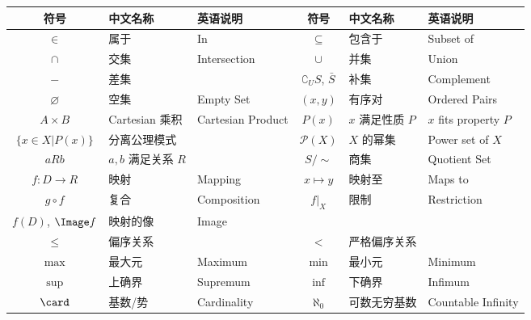 \documentclass[UTF8]{ctexart}
\begin{document}
            \begin{center}
                \begin{tabular}{|c|l|l||c|l|l|}
                    \hline
                    符号 & 中文名称 & 英语说明 & 符号 & 中文名称 & 英语说明\\
                    \hline\hline
                    $\in$ & 属于 & In & $\subseteq$ & 包含于 & Subset of\\
                    \hline
                    $\cap$ & 交集 & Intersection & $\cup$ & 并集 & Union\\
                    \hline
                    $-$ & 差集 &  & $\complement_U S$, $\bar{S}$ & 补集 & Complement\\
                    \hline
                    $\varnothing$ & 空集 & Empty Set & $(x,y)$ & 有序对 & Ordered Pairs\\
                    \hline
                    $A\times B$ & Cartesian 乘积 & Cartesian Product & $P(x)$ & $x$ 满足性质 $P$ & $x$ fits property $P$\\
                    \hline
                    $\{x\in X|P(x)\}$ & 分离公理模式 & & $\mathcal{P}(X)$ & $X$ 的幂集 & Power set of $X$\\
                    \hline
                    $aRb$ & $a,b$ 满足关系 $R$ & & $S/\sim$ & 商集 & Quotient Set\\
                    \hline
                    $f:D\to R$ & 映射 & Mapping & $x\mapsto y$ & 映射至 & Maps to\\
                    \hline
                    $g\circ f$ & 复合 & Composition & $f|_X$ & 限制 & Restriction\\
                    \hline
                    $f(D)$, $\Image f$ & 映射的像 & Image &\\
                    \hline
                    $\leq$ & 偏序关系 & & $<$ & 严格偏序关系 &\\
                    \hline
                    $\max$ & 最大元 & Maximum & $\min$ & 最小元 & Minimum\\
                    \hline
                    $\sup$ & 上确界 & Supremum & $\inf$ & 下确界 & Infimum\\
                    \hline
                    $\card$ & 基数/势 & Cardinality & $\aleph_0$ & 可数无穷基数 & Countable Infinity\\
                    \hline
                \end{tabular}
            \end{center}
\end{document}
